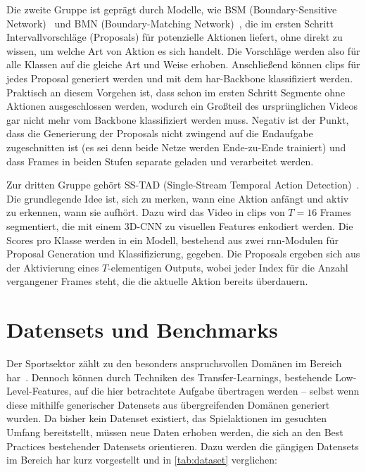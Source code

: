 Die zweite Gruppe ist geprägt durch Modelle, wie BSM (Boundary-Sensitive Network)~\cite{Lin18} und BMN (Boundary-Matching Network)~\cite{Lin19}, die im ersten Schritt Intervallvorschläge (Proposals) für potenzielle Aktionen liefert, ohne direkt zu wissen, um welche Art von Aktion es sich handelt.
Die Vorschläge werden also für alle Klassen auf die gleiche Art und Weise erhoben.
Anschließend können \glspl{clip} für jedes Proposal generiert werden und mit dem \gls{har}-Backbone klassifiziert werden.
Praktisch an diesem Vorgehen ist, dass schon im ersten Schritt Segmente ohne Aktionen ausgeschlossen werden, wodurch ein Großteil des ursprünglichen Videos gar nicht mehr vom Backbone klassifiziert werden muss.
Negativ ist der Punkt, dass die Generierung der Proposals nicht zwingend auf die Endaufgabe zugeschnitten ist (es sei denn beide Netze werden Ende-zu-Ende trainiert) und dass Frames in beiden Stufen separate geladen und verarbeitet werden.

Zur dritten Gruppe gehört \ua SS-TAD (Single-Stream Temporal Action Detection)~\cite{Buch17}.
Die grundlegende Idee ist, sich zu merken, wann eine Aktion anfängt und aktiv zu erkennen, wann sie aufhört.
Dazu wird das Video in \glspl{clip} von $T=16$ Frames segmentiert, die mit einem 3D-CNN zu visuellen Features enkodiert werden.
Die Scores pro Klasse werden in ein Modell, bestehend aus zwei \gls{rnn}-Modulen für Proposal Generation und Klassifizierung, gegeben.
Die Proposals ergeben sich aus der Aktivierung eines $T$-elementigen Outputs, wobei jeder Index für die Anzahl vergangener Frames steht, die die aktuelle Aktion bereits überdauern.

\section{Datensets und Benchmarks}
\label{sec:datensets-und-benchmarks}

Der Sportsektor zählt zu den besonders anspruchsvollen Domänen im Bereich \gls{har}~\cite{Sozykin17}.
Dennoch können durch Techniken des Transfer-Learnings, bestehende Low-Level-Features, auf die hier betrachtete Aufgabe übertragen werden -- selbst wenn diese mithilfe generischer Datensets aus übergreifenden Domänen generiert wurden.
Da bisher kein Datenset existiert, das Spielaktionen im gesuchten Umfang bereitstellt, müssen neue Daten erhoben werden, die sich an den Best Practices bestehender Datensets orientieren.
Dazu werden die gängigen Datensets im Bereich \gls{har} kurz vorgestellt und in \autoref{tab:dataset} verglichen:

